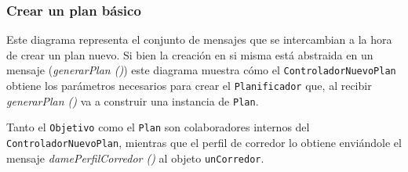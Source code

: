 \subsubsection{Crear un plan básico}

Este diagrama representa el conjunto de mensajes que se intercambian a la hora de crear un plan nuevo. Si bien la creación en si misma está abstraida en un mensaje (\emph{generarPlan ()}) este diagrama muestra cómo el \texttt{ControladorNuevoPlan} obtiene los parámetros necesarios para crear el \texttt{Planificador} que, al recibir \emph{generarPlan ()} va a construir una instancia de \texttt{Plan}. 

Tanto el \texttt{Objetivo} como el \texttt{Plan} son colaboradores internos del \texttt{ControladorNuevoPlan}, mientras que el perfil de corredor lo obtiene enviándole el mensaje \emph{damePerfilCorredor ()} al objeto \texttt{unCorredor}.